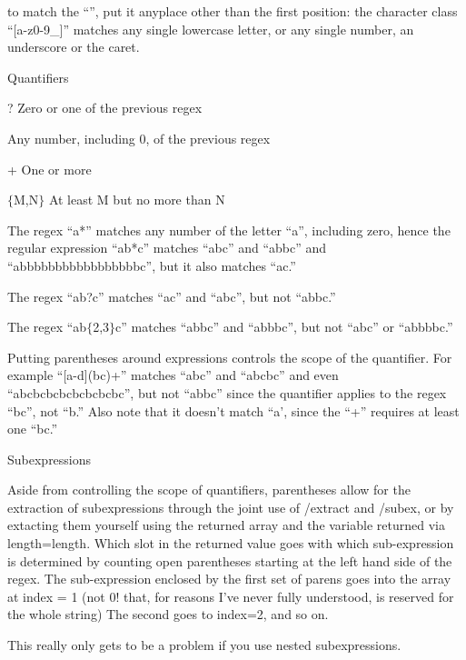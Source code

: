   \item to match the ``\caret'', put it anyplace other than the first
  position: the character class ``[a-z0-9\_\caret ]'' matches any
  single lowercase letter, or any single number, an underscore or the
  caret.

\ei

    \item Quantifiers

      
     \bi
        \item ? Zero or one of the previous regex
        \item * Any number, including 0, of the previous regex
        \item + One or more
	\item $\{$M,N$\}$ At least M but no more than N
     \ei

  The regex ``a*'' matches any number of the letter ``a'', including
  zero, hence the regular expression ``ab*c'' matches ``abc'' and
  ``abbc'' and ``abbbbbbbbbbbbbbbbbc'', but it also matches
  ``ac.'' 

  The regex ``ab?c'' matches ``ac'' and ``abc'', but not ``abbc.'' 

  The regex ``ab$\{$2,3$\}$c'' matches ``abbc'' and ``abbbc'', but not
  ``abc'' or ``abbbbc.''

  Putting parentheses around expressions controls the scope of the
  quantifier. For example ``[a-d](bc)+'' matches ``abc'' and ``abcbc''
  and even ``abcbcbcbcbcbcbcbc'', but not ``abbc'' since the
  quantifier applies to the regex ``bc'', not ``b.'' Also note that it
  doesn't match ``a', since the ``+'' requires at least one ``bc.''

    \item Subexpressions

  Aside from controlling the scope of quantifiers, parentheses allow
  for the extraction of subexpressions through the joint use of
  /extract and /subex, or by extacting them yourself using the
  returned array and the variable returned via length=length. Which
  slot in the returned value goes with which sub-expression is
  determined by counting open parentheses starting at the left hand
  side of the regex. The sub-expression enclosed by the first set of
  parens goes into the array at index = 1 (not 0! that, for reasons
  I've never fully understood, is reserved for the whole string) The
  second goes to index=2, and so on.

  This really only gets to be a problem if you use nested subexpressions. 

